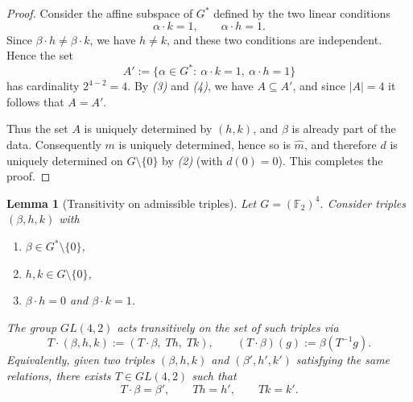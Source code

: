 \documentclass[12pt,twoside,]{amsart}
\theoremstyle{plain}
\newtheorem{lemma}[theorem]{Lemma}
\theoremstyle{definition}
\begin{document}
\begin{proof}
Consider the affine subspace of $G^*$ defined by the two linear conditions
\[
\alpha\cdot k=1,\qquad \alpha\cdot h=1.
\]
Since $\beta\cdot h\neq\beta\cdot k$, we have $h\neq k$, and these two conditions
are independent.  Hence the set
\[
A':=\{\alpha\in G^*:\ \alpha\cdot k=1,\ \alpha\cdot h=1\}
\]
has cardinality $2^{4-2}=4$.  By \emph{(3)} and \emph{(4)}, we have $A\subseteq A'$,
and since $|A|=4$ it follows that $A=A'$.

Thus the set $A$ is uniquely determined by $(h,k)$, and $\beta$ is already part of
the data.  Consequently $m$ is uniquely determined, hence so is $\widehat m$, and
therefore $d$ is uniquely determined on $G\setminus\{0\}$ by \emph{(2)} (with
$d(0)=0$).  This completes the proof.
\end{proof}

\begin{lemma}[Transitivity on admissible triples]
Let $G=(\mathbb F_2)^4$.  Consider triples $(\beta,h,k)$ with
\begin{enumerate}
\item $\beta\in G^*\setminus\{0\}$,
\item $h,k\in G\setminus\{0\}$,
\item $\beta\cdot h=0$ and $\beta\cdot k=1$.
\end{enumerate}
The group $GL(4,2)$ acts transitively on the set of such triples via
\[
T\cdot(\beta,h,k):=(T\cdot\beta,\;Th,\;Tk),
\qquad
(T\cdot\beta)(g):=\beta(T^{-1}g).
\]
Equivalently, given two triples $(\beta,h,k)$ and $(\beta',h',k')$ satisfying the
same relations, there exists $T\in GL(4,2)$ such that
\[
T\cdot\beta=\beta',\qquad Th=h',\qquad Tk=k'.
\]
\end{lemma}
\end{document}
